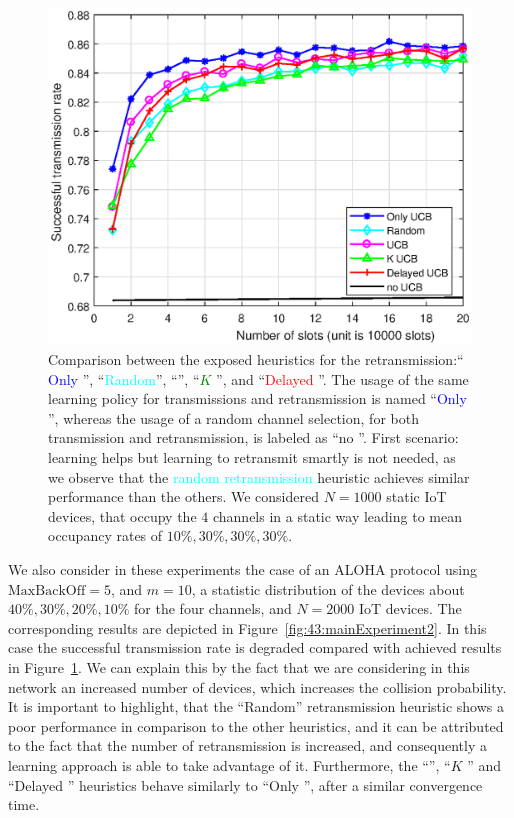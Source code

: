\begin{figure}[h!]  %
	\centering
	\includegraphics[width=0.90\linewidth]{ResultsUCB.eps}
	\caption[First comparison between the exposed heuristics for the retransmission: ``Only \UCB'', ``Random, \UCB'', ``$K$ \UCB'', and ``Delayed \UCB''.]{
		Comparison between the exposed heuristics for the retransmission:`` \textcolor{blue}{Only \UCB}'', ``\textcolor{cyan}{Random}'', ``\textcolor{purple}{\UCB}'', ``\textcolor{green}{$K$ \UCB}'', and ``\textcolor{red}{Delayed \UCB}''.
		The usage of the same learning policy for transmissions and retransmission is named ``\textcolor{blue}{Only \UCB{}}'',
		whereas the usage of a random channel selection, for both transmission and retransmission, is labeled as ``no \UCB{}''.
		First scenario: learning helps but learning to retransmit smartly is not needed, as we observe that the \textcolor{cyan}{random retransmission} heuristic achieves similar performance than the others.
		We considered $N=1000$ static IoT devices, that occupy the $4$ channels in a static way leading to mean occupancy rates of $10\%,30\%,30\%,30\%$.
	}
	\label{fig:43:mainExperiment1}
\end{figure}

We also consider in these experiments the case of an ALOHA protocol using $\mathrm{MaxBackOff}=5$, and $m=10$, a statistic distribution of the devices about $40\%, 30\%, 20\%, 10\%$ for the four channels, and $N=2000$ IoT devices.
The corresponding results are depicted in Figure~\ref{fig:43:mainExperiment2}.
In this case the successful transmission rate is degraded compared with achieved results in Figure~\ref{fig:43:mainExperiment1}.
We can explain this by the fact that we are considering in this network an increased number of devices, which increases the collision probability.
It is important to highlight, that the ``Random'' retransmission heuristic shows a poor performance in comparison to the other heuristics, and it can be attributed to the fact that the number of retransmission is increased, and consequently a
learning approach is able to take advantage of it.
Furthermore, the ``\UCB'', ``$K$ \UCB'' and ``Delayed \UCB'' heuristics behave similarly to ``Only \UCB'', after a similar convergence time.

